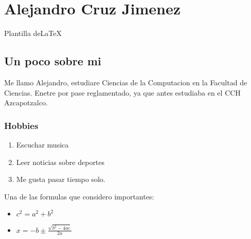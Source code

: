 \chapter {Alejandro Cruz Jimenez}

Plantilla de\large{\LaTeX}
\section {Un poco sobre mi}

Me llamo Alejandro, estudiare Ciencias de la Computacion en la Facultad de Ciencias. Enetre por pase reglamentado, ya que antes estudiaba en el CCH Azcapotzalco.

\subsection {Hobbies}
\begin{enumerate}
\item Escuchar musica
\item Leer noticias sobre deportes
\item Me gusta pasar tiempo solo.
\end{enumerate}

\newpage

Una de las formulas que considero importantes:
\begin {itemize}
\item $c^2 = a^2 + b^2$
\item  $x=-b \pm \frac{\sqrt{b^2-4ac}} {2a}$
\end{itemize}


